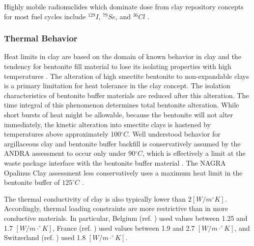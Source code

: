 
Highly mobile radionuclides which dominate dose from clay repository concepts 
for most fuel cycles include $^{129}I$, $^{79}Se$, and $^{36}Cl$ 
\cite{swift_applying_2010}. 

\subsubsection{Thermal Behavior}
\label{subsec:claythermal}


Heat limits in clay are based on the domain of known behavior in clay and the 
tendency for bentonite fill material to lose its isolating properties with high 
temperatures \cite{andra_argile:_2005, pusch_alteration_1987}. 
The alteration of high smectite bentonite to non-expandable clays is a primary 
limitation for heat tolerance in the clay concept. The isolation characteristics 
of bentonite buffer materials are reduced after this alteration. The time 
integral of this phenomenon determines total bentonite alteration. While short 
bursts of heat might be allowable, because the bentonite will not alter 
immediately, the kinetic alteration into smectite clays is hastened by 
temperatures above approximately 100$^{\circ}C$\cite{pusch_alteration_1987}. 
Well understood behavior for argillaceous clay and bentonite buffer backfill
is conservatively assumed by the \gls{ANDRA} assessment to occur only under  
90$^{\circ}C$, which is effectively a limit at the waste package interface with 
the bentonite buffer material\cite{andra_argile:_2005} .
The \gls{NAGRA} Opalinus Clay assessment less conservatively 
uses a maximum heat limit in the bentonite buffer of $125^{\circ}C$
\cite{johnson_project_2002} .


% 

The thermal conductivity of clay is also typically lower than 
$2[W/m^{\circ}K]$. 
Accordingly, thermal loading constraints are more restrictive than in more 
conductive materials. 
In particular, Belgium (ref. 
\cite{ondraf-niras_technical_2001}) 
used values between 1.25 and 1.7 $[W/m\cdot^{\circ}K]$,
France (ref. \cite{andra_argile:_2005}) used values between 1.9 and 2.7 
$[W/m\cdot^{\circ}K]$, and Switzerland (ref. \cite{johnson_calculations_2002}) used 1.8 $[W/m\cdot^{\circ}K]$.

